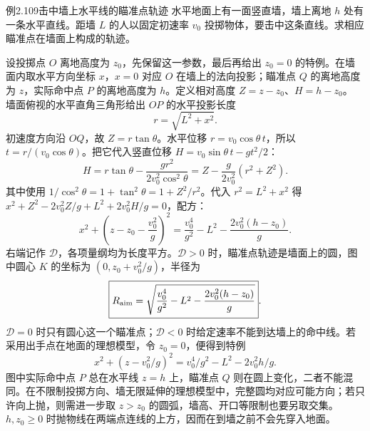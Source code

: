 \KinematicKeepSpace{10cm}
\begin{origexamplebox}{例2.109\quad 击中墙上水平线的瞄准点轨迹}
水平地面上有一面竖直墙，墙上离地 $h$ 处有一条水平直线。距墙 $L$ 的人以固定初速率 $v_0$ 投掷物体，要击中这条直线。求相应瞄准点在墙面上构成的轨迹。
\end{origexamplebox}
\begin{xesolution}
设投掷点 $O$ 离地高度为 $z_0$，先保留这一参数，最后再给出 $z_0=0$ 的特例。在墙面内取水平方向坐标 $x$，$x=0$ 对应 $O$ 在墙上的法向投影；瞄准点 $Q$ 的离地高度为 $z$，实际命中点 $P$ 的离地高度为 $h$。定义相对高度 $Z=z-z_0$、$H=h-z_0$。
\AimLocusDiagram
墙面俯视的水平直角三角形给出 $OP$ 的水平投影长度
\[
r=\sqrt{L^2+x^2}.
\]
初速度方向沿 $OQ$，故 $Z=r\tan\theta$。水平位移 $r=v_0\cos\theta\,t$，所以 $t=r/(v_0\cos\theta)$。把它代入竖直位移 $H=v_0\sin\theta\,t-gt^2/2$：
\[
H=r\tan\theta-\frac{gr^2}{2v_0^2\cos^2\theta}
=Z-\frac{g}{2v_0^2}(r^2+Z^2).
\]
其中使用 $1/\cos^2\theta=1+\tan^2\theta=1+Z^2/r^2$。代入 $r^2=L^2+x^2$ 得 $x^2+Z^2-2v_0^2Z/g+L^2+2v_0^2H/g=0$，配方：
\[
\boxed{x^2+\left(z-z_0-\frac{v_0^2}{g}\right)^2
=\frac{v_0^4}{g^2}-L^2-\frac{2v_0^2(h-z_0)}{g}}.
\]
右端记作 $\mathcal D$，各项量纲均为长度平方。$\mathcal D>0$ 时，瞄准点轨迹是墙面上的圆，图中圆心 $K$ 的坐标为 $(0,z_0+v_0^2/g)$，半径为
\[
\boxed{R_{\rm aim}=\sqrt{\frac{v_0^4}{g^2}-L^2-\frac{2v_0^2(h-z_0)}{g}}}.
\]
$\mathcal D=0$ 时只有圆心这一个瞄准点；$\mathcal D<0$ 时给定速率不能到达墙上的命中线。若采用出手点在地面的理想模型，令 $z_0=0$，便得到特例
\[
x^2+(z-v_0^2/g)^2=v_0^4/g^2-L^2-2v_0^2h/g.
\]
图中实际命中点 $P$ 总在水平线 $z=h$ 上，瞄准点 $Q$ 则在圆上变化，二者不能混同。在不限制投掷方向、墙无限延伸的理想模型中，完整圆均对应可能方向；若只许向上抛，则需进一步取 $z>z_0$ 的圆弧，墙高、开口等限制也要另取交集。$h,z_0\ge0$ 时抛物线在两端点连线的上方，因而在到墙之前不会先穿入地面。
\end{xesolution}
